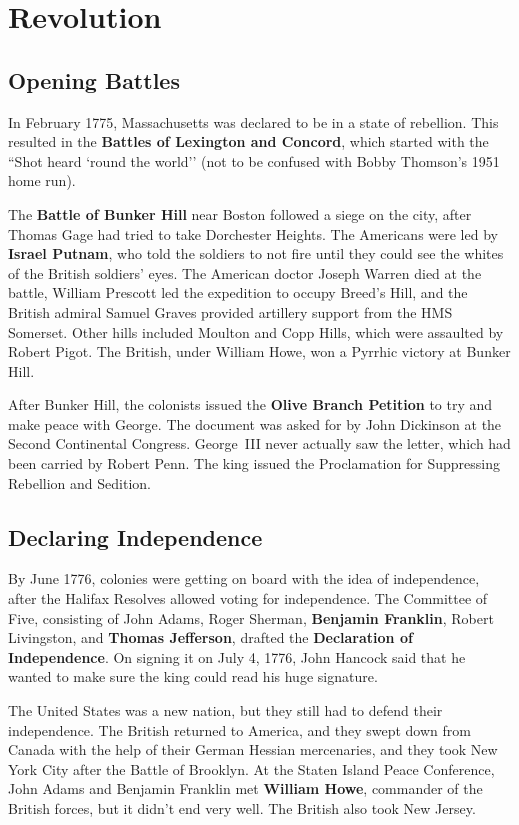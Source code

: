 \section{Revolution}

\subsection*{Opening Battles}

In February 1775, Massachusetts was declared to be in a state of rebellion.
This resulted in the \textbf{Battles of Lexington and Concord},
which started with the ``Shot heard `round the world''
(not to be confused with Bobby Thomson's 1951 home run).

The \textbf{Battle of Bunker Hill} near Boston followed a siege on the city,
after Thomas Gage had tried to take Dorchester Heights.
The Americans were led by \textbf{Israel Putnam}, who told the soldiers to
not fire until they could see the whites of the British soldiers' eyes.
The American doctor Joseph Warren died at the battle,
William Prescott led the expedition to occupy Breed's Hill,
and the British admiral Samuel Graves provided artillery support from the HMS Somerset.
Other hills included Moulton and Copp Hills, which were assaulted by Robert Pigot.
The British, under William Howe, won a Pyrrhic victory at Bunker Hill.

After Bunker Hill, the colonists issued the \textbf{Olive Branch Petition}
to try and make peace with George.
The document was asked for by John Dickinson at the Second Continental Congress.
George~III never actually saw the letter, which had been carried by Robert Penn.
The king issued the Proclamation for Suppressing Rebellion and Sedition.

\subsection*{Declaring Independence}

By June 1776, colonies were getting on board with the idea of independence,
after the Halifax Resolves allowed voting for independence.
The Committee of Five, consisting of
John Adams,
Roger Sherman,
\textbf{Benjamin Franklin},
Robert Livingston,
and \textbf{Thomas Jefferson},
drafted the \textbf{Declaration of Independence}.
On signing it on July 4, 1776,
John Hancock said that he wanted to make sure the king could read his huge signature.

The United States was a new nation, but they still had to defend their independence.
The British returned to America, and they swept down from Canada with the help of their German Hessian mercenaries,
and they took New York City after the Battle of Brooklyn.
At the Staten Island Peace Conference, John Adams and Benjamin Franklin met \textbf{William Howe},
commander of the British forces, but it didn't end very well.
The British also took New Jersey.

